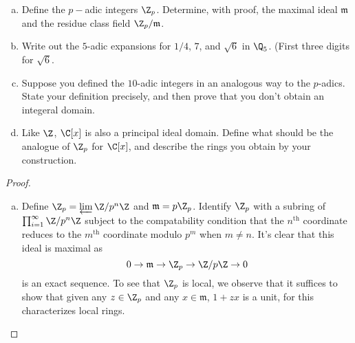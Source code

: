 \documentclass[10pt]{amsart}
\begin{document}
\begin{thm}\label{Ex3}
	\begin{enumerate}[(a)]
		\item
		Define the $p-$adic integers $\Z_p$.
		Determine, with proof, the maximal ideal $\mathfrak{m}$ and the residue class field $\Z_p/\mathfrak{m}$.
		\item
		Write out the $5$-adic expansions for $1/4$, $7$, and $\sqrt{6}$ in $\Q_5$. (First three digits for $\sqrt{6}$.
		\item
		Suppose you defined the $10$-adic integers in an analogous way to the $p$-adics.
		State your definition precisely, and then prove that you don't obtain an integeral domain.
		\item
		Like $\Z$, $\C[x]$ is also a principal ideal domain.
		Define what should be the analogue of $\Z_p$ for $\C[x]$, and describe the rings you obtain by your construction.
	\end{enumerate}
		
		\begin{proof}
		\begin{enumerate}[(a)]
		\item
		Define $\Z_p = \varprojlim{\Z/p^n\Z}$ and $\mathfrak{m} = p\Z_p$.
		Identify $\Z_p$ with a subring of $\prod_{i=1}^\infty \Z/p^n\Z$ subject to the compatability condition that the $n^\text{th}$ coordinate reduces to the $m^\text{th}$ coordinate modulo $p^m$ when $m \neq n$.
		It's clear that this ideal is maximal as
		$$0 \rightarrow \mathfrak{m} \rightarrow \Z_p \rightarrow \Z/p\Z \rightarrow 0$$
		is an exact sequence.
		To see that $\Z_p$ is local, we observe that it suffices to show that given any $z \in \Z_p$ and any $x \in \mathfrak{m}$, $1 + zx$ is a unit, for this characterizes local rings.
		

\end{enumerate}
\end{proof}
\end{thm}
\end{document}
